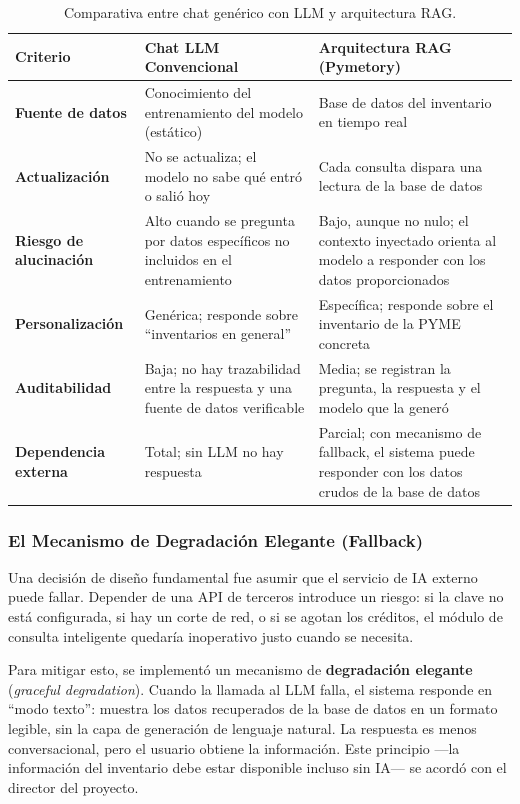 \begin{table}[!htbp]
\centering
\caption{Comparativa entre chat genérico con LLM y arquitectura RAG.}
\label{tab:rag_vs_chat}
\begin{tabular}{|p{3cm}|p{4cm}|p{5cm}|}
\hline
\textbf{Criterio} & \textbf{Chat LLM Convencional} & \textbf{Arquitectura RAG (Pymetory)} \\
\hline
\textbf{Fuente de datos} & Conocimiento del entrenamiento del modelo (estático) & Base de datos del inventario en tiempo real \\
\hline
\textbf{Actualización} & No se actualiza; el modelo no sabe qué entró o salió hoy & Cada consulta dispara una lectura de la base de datos \\
\hline
\textbf{Riesgo de alucinación} & Alto cuando se pregunta por datos específicos no incluidos en el entrenamiento & Bajo, aunque no nulo; el contexto inyectado orienta al modelo a responder con los datos proporcionados \\
\hline
\textbf{Personalización} & Genérica; responde sobre ``inventarios en general'' & Específica; responde sobre el inventario de la PYME concreta \\
\hline
\textbf{Auditabilidad} & Baja; no hay trazabilidad entre la respuesta y una fuente de datos verificable & Media; se registran la pregunta, la respuesta y el modelo que la generó \\
\hline
\textbf{Dependencia externa} & Total; sin LLM no hay respuesta & Parcial; con mecanismo de fallback, el sistema puede responder con los datos crudos de la base de datos \\
\hline
\end{tabular}
\end{table}

\subsubsection{El Mecanismo de Degradación Elegante (Fallback)}

Una decisión de diseño fundamental fue asumir que el servicio de IA externo puede fallar. Depender de una API de terceros introduce un riesgo: si la clave no está configurada, si hay un corte de red, o si se agotan los créditos, el módulo de consulta inteligente quedaría inoperativo justo cuando se necesita.

Para mitigar esto, se implementó un mecanismo de \textbf{degradación elegante} (\textit{graceful degradation}). Cuando la llamada al LLM falla, el sistema responde en ``modo texto'': muestra los datos recuperados de la base de datos en un formato legible, sin la capa de generación de lenguaje natural. La respuesta es menos conversacional, pero el usuario obtiene la información. Este principio ---la información del inventario debe estar disponible incluso sin IA--- se acordó con el director del proyecto.

